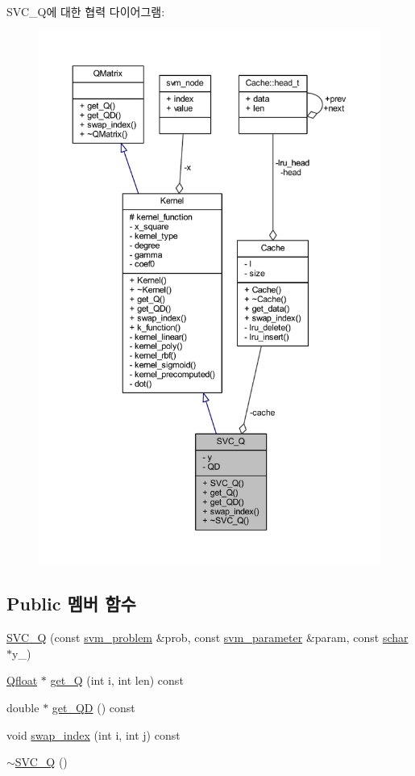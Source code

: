 S\+V\+C\+\_\+\+Q에 대한 협력 다이어그램\+:
\nopagebreak
\begin{figure}[H]
\begin{center}
\leavevmode
\includegraphics[width=350pt]{class_s_v_c___q__coll__graph}
\end{center}
\end{figure}
\subsection*{Public 멤버 함수}
\begin{DoxyCompactItemize}
\item 
\hyperlink{class_s_v_c___q_a23d7cf0b0606ccf2cb987205b94dddc7}{S\+V\+C\+\_\+\+Q} (const \hyperlink{structsvm__problem}{svm\+\_\+problem} \&prob, const \hyperlink{structsvm__parameter}{svm\+\_\+parameter} \&param, const \hyperlink{svm_8cpp_a0fd9ce9d735064461bebfe6037026093}{schar} $\ast$y\+\_\+)
\item 
\hyperlink{svm_8cpp_a8755d90a54ecfb8d15051af3e0542592}{Qfloat} $\ast$ \hyperlink{class_s_v_c___q_a9341b6030b3fdc88466e4a602b5abff0}{get\+\_\+\+Q} (int i, int len) const 
\item 
double $\ast$ \hyperlink{class_s_v_c___q_ac73020a6e438e209d63223e1fa8cac29}{get\+\_\+\+Q\+D} () const 
\item 
void \hyperlink{class_s_v_c___q_a9c889db8ee0156ed5bcdaa4d6bc4e245}{swap\+\_\+index} (int i, int j) const 
\item 
\hyperlink{class_s_v_c___q_af491500a4a6e2df46083098ee3397142}{$\sim$\+S\+V\+C\+\_\+\+Q} ()
\end{DoxyCompactItemize}
